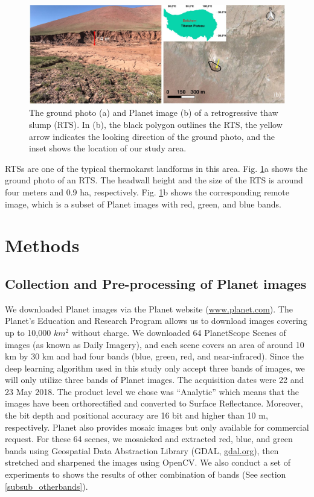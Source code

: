 \documentclass[preprint,12pt,authoryear]{elsarticle}
\begin{document}
\begin{figure}[ht]
	\centering
	\includegraphics[width=14cm]{figures/study_area_loc_RTS_photo_trim.jpg}
	\caption{The ground photo (a) and Planet image (b) of a retrogressive thaw slump (RTS). In (b), the black polygon outlines the RTS, the yellow arrow indicates the looking direction of the ground photo, and the inset shows the location of our study area.}
	\label{fig_rts_groundphoto}
\end{figure}

RTSs are one of the typical thermokarst landforms in this area. Fig. \ref{fig_rts_groundphoto}a shows the ground photo of an RTS. The headwall height and the size of the RTS is around four meters and 0.9 ha, respectively. Fig. \ref{fig_rts_groundphoto}b shows the corresponding remote  image, which is a subset of Planet images with red, green, and blue bands. 

\section{Methods}
\label{sec_meth}

\subsection{Collection and Pre-processing of Planet images}
\label{subsec_collect_images}

We downloaded Planet images via the Planet website (\url{www.planet.com}). The Planet’s Education and Research Program allows us to download images covering up to 10,000 $km^2$ without charge. We downloaded 64 PlanetScope Scenes of images (as known as Daily Imagery), and each scene covers an area of around 10 km by 30 km and had four bands (blue, green, red, and near-infrared). Since the deep learning algorithm used in this study only accept three bands of images, we will only utilize three bands of Planet images. The acquisition dates were 22 and 23 May 2018. The product level we chose was “Analytic” which means that the images have been orthorectified and converted to Surface Reflectance. Moreover, the bit depth and positional accuracy are 16 bit and higher than 10 m, respectively. Planet also provides mosaic images but only available for commercial request. For these 64 scenes, we mosaicked and extracted red, blue, and green bands using Geospatial Data Abstraction Library (GDAL, \url{gdal.org}), then stretched and sharpened the images using OpenCV. We also conduct a set of experiments to shows the results of other combination of bands (See section \ref{subsub_otherbands}). 
\end{document}
